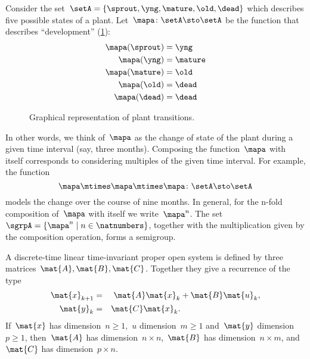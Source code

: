 \begin{example}
    \label{exa:plant-trafo-semigroup}
    Consider the set~$\setA = \{ \sprout, \yng, \mature, \old, \dead \}$ which describes five possible states of a plant. Let~$\mapa \colon \setA \sto \setA$ be the function that describes ``development'' (\cref{fig:plants_transitions}):
    \begin{align*}
        \mapa(\sprout) &=  \yng \\
        \mapa(\yng) &=  \mature \\
        \mapa(\mature) &=  \old \\
        \mapa( \old) &= \dead \\
        \mapa (\dead) &= \dead
    \end{align*}
    \begin{figure}[h]
        \caption{Graphical representation of plant transitions.}
        \label{fig:plants_transitions}
    \end{figure}
    In other words, we think of~$\mapa$ as the change of state of the plant during a given time interval (say, three months).
    Composing the function~$\mapa$ with itself corresponds to considering multiples of the given time interval.
    For example, the function
    \begin{equation*}
        \mapa \mtimes \mapa \mtimes \mapa \colon \setA \sto \setA
    \end{equation*}
    models the change over the course of nine months.
    In general, for the n-fold composition of~$\mapa$ with itself we write~$\mapa^n$.
    The set~$\sgrpA = \{ \mapa^n \mid n \in \natnumbers \}$, together with the multiplication given by the composition operation, forms a semigroup.
\end{example}

\label{ex:discrete-time-linear}
\begin{definition}
    \label{def:discrete-time-linear-system}
    A discrete-time linear time-invariant proper open system is defined by three matrices~$\mat{A},\mat{B},\mat{C}$.
    Together they give a recurrence of the type
    \begin{equation}
        \label{eq:discrete-time-dynamics}
        \begin{aligned}
            \mat{x}_{k+1} &=& \mat{A} \mat{x}_k & + \mat{B} \mat{u}_k,\\
            \mat{y}_{k}   &=& \mat{C} \mat{x}_k.  \\
        \end{aligned}
    \end{equation}
    If~$\mat{x}$ has dimension~$n\geq1$,~$u$ dimension~$m\geq1$ and~$\mat{y}$ dimension~$p\geq1$, then~$\mat{A}$ has dimension~$n \times n$,~$\mat{B}$ has dimension~$n \times m$, and~$\mat{C}$ has dimension~$p \times n$.
\end{definition}

